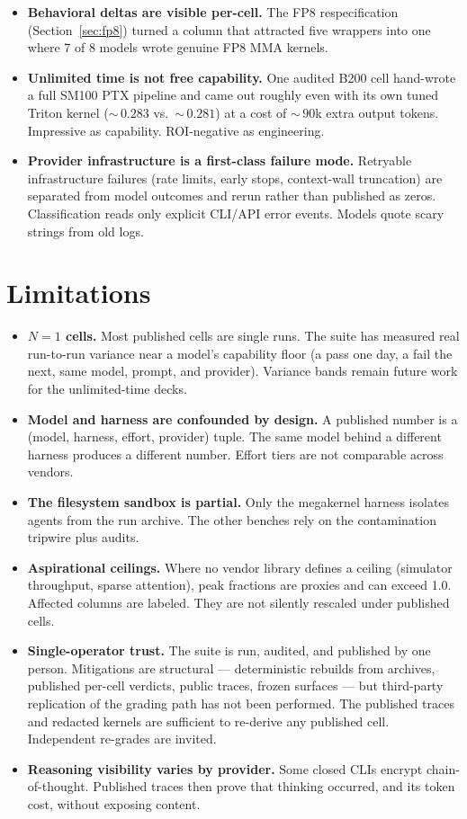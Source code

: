 \documentclass[11pt]{article}
\begin{document}
\begin{itemize}
\item \textbf{Behavioral deltas are visible per-cell.} The FP8 respecification (Section~\ref{sec:fp8}) turned a column that attracted five wrappers into one where 7 of 8 models wrote genuine FP8 MMA kernels.
\item \textbf{Unlimited time is not free capability.} One audited B200 cell hand-wrote a full SM100 PTX pipeline and came out roughly even with its own tuned Triton kernel (${\sim}\,0.283$ vs.\ ${\sim}\,0.281$) at a cost of ${\sim}\,90$k extra output tokens. Impressive as capability. ROI-negative as engineering.
\item \textbf{Provider infrastructure is a first-class failure mode.} Retryable infrastructure failures (rate limits, early stops, context-wall truncation) are separated from model outcomes and rerun rather than published as zeros. Classification reads only explicit CLI/API error events. Models quote scary strings from old logs.
\end{itemize}

\section{Limitations}
\label{sec:limits}

\begin{itemize}
\item \textbf{$N{=}1$ cells.} Most published cells are single runs. The suite has measured real run-to-run variance near a model's capability floor (a pass one day, a fail the next, same model, prompt, and provider). Variance bands remain future work for the unlimited-time decks.
\item \textbf{Model and harness are confounded by design.} A published number is a (model, harness, effort, provider) tuple. The same model behind a different harness produces a different number. Effort tiers are not comparable across vendors.
\item \textbf{The filesystem sandbox is partial.} Only the megakernel harness isolates agents from the run archive. The other benches rely on the contamination tripwire plus audits.
\item \textbf{Aspirational ceilings.} Where no vendor library defines a ceiling (simulator throughput, sparse attention), peak fractions are proxies and can exceed 1.0. Affected columns are labeled. They are not silently rescaled under published cells.
\item \textbf{Single-operator trust.} The suite is run, audited, and published by one person. Mitigations are structural --- deterministic rebuilds from archives, published per-cell verdicts, public traces, frozen surfaces --- but third-party replication of the grading path has not been performed. The published traces and redacted kernels are sufficient to re-derive any published cell. Independent re-grades are invited.
\item \textbf{Reasoning visibility varies by provider.} Some closed CLIs encrypt chain-of-thought. Published traces then prove that thinking occurred, and its token cost, without exposing content.
\end{itemize}
\end{document}
